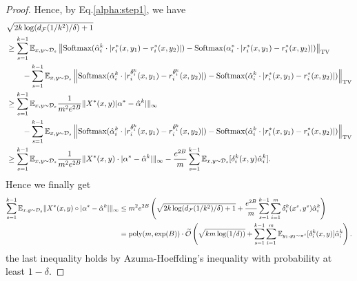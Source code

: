 \begin{proof}
     Hence, by Eq.\eqref{alpha:step1}, we have
    \begin{align*}
        &\sqrt{2k\log(d_{\mathcal{F}}(1/k^2)/\delta)+1}\\
        &\ge \sum_{s=1}^{k-1} \mathbb{E}_{x, y\sim \mathcal{D}_s}\left\| \textrm{Softmax}(\hat{\alpha}_i^k \cdot |r_i^*(x,y_1)-r_i^*(x,y_2)|)-\textrm{Softmax}(\alpha_i^*\cdot |r_i^*(x,y_1)-r_i^*(x,y_2)|)\right\| _{\mathrm{TV}}\\
        &\qquad - \sum_{s=1}^{k-1} \mathbb{E}_{x, y\sim \mathcal{D}_s}\left\| \textrm{Softmax}(\hat{\alpha}_i^k \cdot |r_i^{\tilde{\theta}_i^k}(x,y_1)-r_i^{\tilde{\theta}_i^k}(x,y_2)|)-\textrm{Softmax}(\hat{\alpha}_i^k\cdot |r_i^*(x,y_1)-r_i^*(x,y_2)|)\right\| _{\mathrm{TV}}\\
        &\ge \sum_{s=1}^{k-1}\mathbb{E}_{x, y\sim \mathcal{D}_s}\frac{1}{m^2e^{2B}}\|X^*(x,y)|\alpha^* - \hat{\alpha}^k|\|_\infty \\
        &\qquad - \sum_{s=1}^{k-1}\mathbb{E}_{x, y\sim \mathcal{D}_s}\left\| \textrm{Softmax}(\hat{\alpha}_i^k \cdot |r_i^{\tilde{\theta}_i^k}(x,y_1)-r_i^{\tilde{\theta}_i^k}(x,y_2)|)-\textrm{Softmax}(\hat{\alpha}_i^k\cdot |r_i^*(x,y_1)-r_i^*(x,y_2)|)\right\| _{\mathrm{TV}} \\
        &\ge \sum_{s=1}^{k-1}\mathbb{E}_{x, y\sim \mathcal{D}_s}\frac{1}{m^2e^{2B}}\|X^*(x,y)\cdot |\alpha^* - \hat{\alpha}^k|\|_\infty - \frac{e^{2B}}{m}\sum_{s=1}^{k-1} \mathbb{E}_{x,y\sim \mathcal{D}_s}[\delta_i^{k}(x,y)\hat{\alpha}_i^k].
    \end{align*}
    Hence we finally get 
    \begin{align}
        \sum_{s=1}^{k-1}\mathbb{E}_{x, y\sim \mathcal{D}_s}\|X^*(x,y)\circ|\alpha^* - \hat{\alpha}^k|\|_\infty &\le m^2e^{2B}\left(\sqrt{2k\log(d_{\mathcal{F}}(1/k^2)/\delta)+1} + \frac{e^{2B}}{m} \sum_{s=1}^{k-1}\sum_{i=1}^m \delta_i^{k}(x^s,y^s) \hat{\alpha}_i^k\right)\nonumber\\
        & = \mathrm{poly}(m, \exp(B))\cdot \widetilde{\mathcal{O}}\left(\sqrt{km\log (1/\delta))} + \sum_{s=1}^{k-1}\sum_{i=1}^m \mathbb{E}_{y_1,y_2\sim \pi^s}[\delta_i^{k}(x,y)]\hat{\alpha}_i^k\right).\label{alpha:step2}
    \end{align}
    the last inequality holds by Azuma-Hoeffding's inequality with probability at least $1-\delta$. 

\end{proof}
